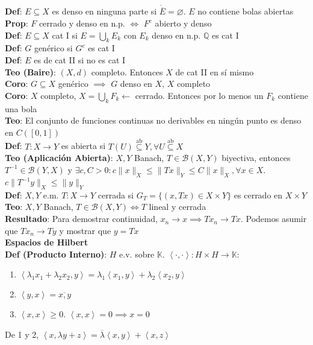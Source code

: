 \documentclass[9pt, letterpaper]{extarticle}
\newcommand{\K}{\mathbb{K}}
\newcommand{\Q}{\mathbb{Q}}
\newcommand{\inn}[1]{\left\langle #1\right\rangle}
\begin{document}
\begin{multicols*}{2}
\textbf{Def}: $E\subseteq X$ es denso en ninguna parte si $\mathring{\overline{E}}=\varnothing$. $E$ no contiene bolas abiertas\\
\textbf{Prop}: $F$ cerrado y denso en n.p. $\iff$ $F^c$ abierto y denso\\
\textbf{Def}: $E\subseteq X$ cat I si $E=\bigcup_k E_k$ con $E_k$ denso en n.p. $\Q$ es cat I\\
\textbf{Def}: $G$ genérico si $G^c$ es cat I\\
\textbf{Def}: $E$ es de cat II si no es cat I\\
\textbf{\color{red}Teo (Baire)}: $(X,d)$ completo. Entonces $X$ de cat II en sí mismo\\
\textbf{Coro}: $G\subseteq X$ genérico $\implies$ $G$ denso en $X$, $X$ completo\\
\textbf{Coro}: $X$ completo, $X=\bigcup_k F_k\leftarrow$ cerrado. Entonces por lo menos un $F_k$ contiene una bola\\
\textbf{Teo}: El conjunto de funciones continuas no derivables en ningún punto es denso en $C([0,1])$\\
\textbf{Def}: $T:X\to Y$ es abierta si $T(U)\overset{\text{ab}}{\subseteq}Y,\forall U\overset{\text{ab}}{\subseteq} X$\\
\textbf{\color{red}Teo (Aplicación Abierta)}: $X,Y$ Banach, $T\in \mathcal{B}(X,Y)$ biyectiva, entonces $T^{-1}\in \mathcal{B}(Y,X)$ y $\exists c,C>0:c\|x\|_X\leq \|Tx\|_Y\leq C\|x\|_X,\forall x\in X$. $c\|T^{-1}y\|_X\leq \|y\|_Y$\\
\textbf{Def}: $X,Y$ e.m. $T:X\to Y$ cerrada si $G_T=\{(x,Tx)\in X\times Y\}$ es cerrado en $X\times Y$\\
\textbf{\color{red}Teo}: $X,Y$ Banach, $T\in\mathcal{B}(X,Y)\iff T$ lineal y cerrada\\
\textbf{Resultado}: Para demostrar continuidad, $x_n\to x\implies Tx_n\to Tx$. Podemos asumir que $Tx_n\to Ty$ y mostrar que $y=Tx$\\
\textbf{Espacios de Hilbert}\\
\textbf{Def (Producto Interno)}: $H$ e.v. sobre $\K$. $\inn{\cdot,\cdot}:H\times H\to \K$:
\begin{enumerate}
	\item $\inn{\lambda_1x_1+\lambda_2x_2,y}=\lambda_1\inn{x_1,y}+\lambda_2\inn{x_2,y}$
	\item $\inn{y,x}=\overline{x,y}$
	\item $\inn{x,x}\geq 0$. $\inn{x,x}=0\implies x=0$
\end{enumerate}
De 1 y 2, $\inn{x,\lambda y+z}=\overline{\lambda}\inn{x,y}+\inn{x,z}$\\

\end{multicols*}
\end{document}
